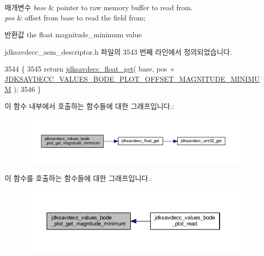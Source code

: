 \begin{DoxyParams}{매개변수}
{\em base} & pointer to raw memory buffer to read from. \\
\hline
{\em pos} & offset from base to read the field from; \\
\hline
\end{DoxyParams}
\begin{DoxyReturn}{반환값}
the float magnitude\+\_\+minimum value 
\end{DoxyReturn}


jdksavdecc\+\_\+aem\+\_\+descriptor.\+h 파일의 3543 번째 라인에서 정의되었습니다.


\begin{DoxyCode}
3544 \{
3545     \textcolor{keywordflow}{return} \hyperlink{group__endian_gadf6108d4d5f2936dd5018e4b80265c8c}{jdksavdecc\_float\_get}( base, pos + 
      \hyperlink{group__values__bode__plot_ga2989129caca431f3046063a15880f54e}{JDKSAVDECC\_VALUES\_BODE\_PLOT\_OFFSET\_MAGNITUDE\_MINIMUM} );
3546 \}
\end{DoxyCode}


이 함수 내부에서 호출하는 함수들에 대한 그래프입니다.\+:
\nopagebreak
\begin{figure}[H]
\begin{center}
\leavevmode
\includegraphics[width=350pt]{group__values__bode__plot_ga572623f6c98a5b0893311392bd99c1c2_cgraph}
\end{center}
\end{figure}




이 함수를 호출하는 함수들에 대한 그래프입니다.\+:
\nopagebreak
\begin{figure}[H]
\begin{center}
\leavevmode
\includegraphics[width=350pt]{group__values__bode__plot_ga572623f6c98a5b0893311392bd99c1c2_icgraph}
\end{center}
\end{figure}


